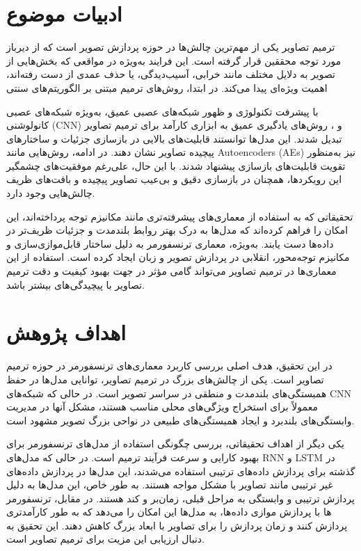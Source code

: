 \section{ادبیات موضوع}
ترمیم تصاویر یکی از مهم‌ترین چالش‌ها در حوزه پردازش تصویر است که از دیرباز مورد توجه محققین قرار گرفته است. این فرایند به‌ویژه در مواقعی که بخش‌هایی از تصویر به دلایل مختلف مانند خرابی، آسیب‌دیدگی، یا حذف عمدی از دست رفته‌اند، اهمیت ویژه‌ای پیدا می‌کند. در ابتدا، روش‌های ترمیم مبتنی بر الگوریتم‌های سنتی 

با پیشرفت تکنولوژی و ظهور شبکه‌های عصبی عمیق، به‌ویژه شبکه‌های عصبی کانولوشنی (CNN) و ، روش‌های یادگیری عمیق به ابزاری کارآمد برای ترمیم تصاویر تبدیل شدند. این مدل‌ها توانستند قابلیت‌های بالایی در بازسازی جزئیات و ساختارهای پیچیده تصاویر نشان دهند. در ادامه، روش‌هایی مانند Autoencoders (AEs) نیز به‌منظور تقویت قابلیت‌های بازسازی پیشنهاد شدند. با این حال، علی‌رغم موفقیت‌های چشمگیر این رویکردها، همچنان در بازسازی دقیق و بی‌عیب تصاویر پیچیده و بافت‌های ظریف چالش‌هایی وجود دارد.

تحقیقاتی که به استفاده از معماری‌های پیشرفته‌تری مانند مکانیزم توجه پرداخته‌اند، این امکان را فراهم کرده‌اند که مدل‌ها به درک بهتر روابط بلندمدت و جزئیات ظریف‌تر در داده‌ها دست یابند. به‌ویژه، معماری ترنسفورمر به دلیل ساختار قابل‌موازی‌سازی و مکانیزم توجه‌محور، انقلابی در پردازش تصویر و زبان ایجاد کرده است. استفاده از این معماری‌ها در ترمیم تصاویر می‌تواند گامی مؤثر در جهت بهبود کیفیت و دقت ترمیم تصاویر با پیچیدگی‌های بیشتر باشد.


\section{اهداف پژوهش}

در این تحقیق، هدف اصلی بررسی کاربرد معماری‌های ترنسفورمر در حوزه ترمیم تصاویر است. یکی از چالش‌های بزرگ در ترمیم تصاویر، توانایی مدل‌ها در حفظ همبستگی‌های بلندمدت و منطقی در سراسر تصویر است. در حالی که شبکه‌های CNN معمولاً برای استخراج ویژگی‌های محلی مناسب هستند، مشکل آنها در مدیریت وابستگی‌های بلندبرد و ایجاد همبستگی‌های طبیعی در نواحی بزرگ تصویر مشهود است.

یکی دیگر از اهداف تحقیقاتی، بررسی چگونگی استفاده از مدل‌های ترنسفورمر برای بهبود کارایی و سرعت فرآیند ترمیم است. در حالی که مدل‌های RNN و LSTM در گذشته برای پردازش داده‌های ترتیبی استفاده می‌شدند، این مدل‌ها در پردازش داده‌های غیر ترتیبی مانند تصاویر با مشکل مواجه هستند. به طور خاص، این مدل‌ها به دلیل پردازش ترتیبی و وابستگی به مراحل قبلی، زمان‌بر و کند هستند. در مقابل، ترنسفورمر ها با پردازش موازی داده‌ها، به مدل‌ها این امکان را می‌دهد که به طور کارآمدتری پردازش کنند و زمان پردازش را برای تصاویر با ابعاد بزرگ کاهش دهند. این تحقیق به دنبال ارزیابی این مزیت برای ترمیم تصاویر است.

